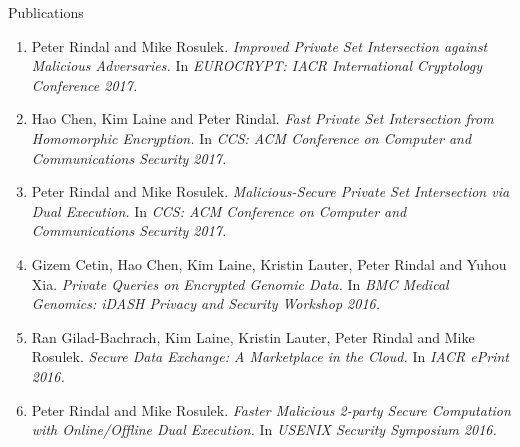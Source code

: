 \documentclass{resume} %
\begin{document}
\begin{rSection}{Publications}
\begin{enumerate}[label=C\arabic* --]
	\item Peter Rindal and Mike Rosulek. \emph{Improved Private Set Intersection against Malicious Adversaries.} In \emph{EUROCRYPT: IACR International Cryptology Conference 2017.}
	
	\item Hao Chen, Kim Laine and Peter Rindal. \emph{Fast Private Set Intersection from Homomorphic Encryption.} In \emph{CCS: ACM Conference on Computer and Communications Security 2017.}
	
	\item Peter Rindal and Mike Rosulek. \emph{Malicious-Secure Private Set Intersection via Dual Execution.} In \emph{CCS: ACM Conference on Computer and Communications Security 2017.}
	
	
	\item Gizem Cetin, Hao Chen, Kim Laine, Kristin Lauter, Peter Rindal and Yuhou Xia. \emph{Private Queries on Encrypted Genomic Data.} In \emph{BMC Medical Genomics:  iDASH Privacy and Security Workshop 2016.}
	
	\item Ran Gilad-Bachrach, Kim Laine, Kristin Lauter, Peter Rindal and Mike Rosulek. \emph{Secure Data Exchange: A Marketplace in the Cloud.} In \emph{IACR ePrint 2016.}
	
	\item Peter Rindal and Mike Rosulek. \emph{Faster Malicious 2-party Secure Computation with Online/Offline Dual Execution.} In \emph{USENIX Security Symposium 2016.}
\end{enumerate}

\end{rSection}



\end{document}
